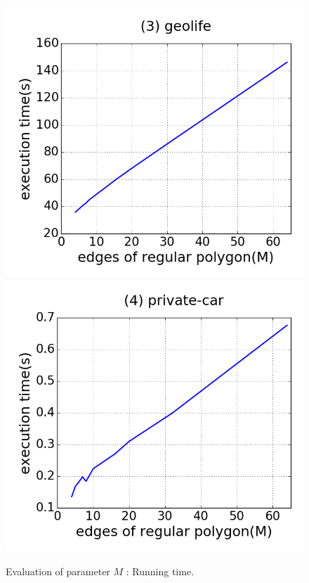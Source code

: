 \begin{figure}[tb!]
\includegraphics[scale = 0.25]{figures/Exp-M-time-geolife.png}
\includegraphics[scale = 0.25]{figures/Exp-M-time-private.png}
\vspace{-3ex}
\caption{\small Evaluation of parameter $M$ : Running time.}
\label{fig:m-time}
\vspace{-1ex}
\end{figure}

